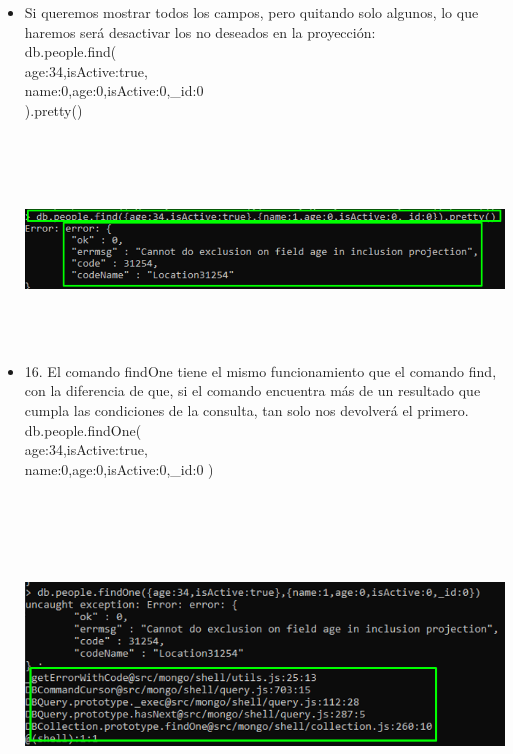 \documentclass[12pt,a4paper,oneside]{book}
\begin{document}
	\newpage
\begin{itemize}
	\item {Si queremos mostrar todos los campos, pero quitando solo algunos, lo que haremos será desactivar los no deseados en la proyección:\\
		
		db.people.find(\\
		{age:34,isActive:true},\\
		{name:0,age:0,isActive:0,\_id:0}\\
		).pretty()
		
	}\\
	\includegraphics[width=16cm, height=5cm]{img/17.png}\\
	
	
	
	\item {16.	El comando findOne tiene el mismo funcionamiento que el comando find, con la diferencia de que, si el comando encuentra más de un resultado que cumpla las condiciones de la consulta, tan solo nos devolverá el primero.\\
		
		db.people.findOne(\\
		{age:34,isActive:true},\\
		{name:0,age:0,isActive:0,\_id:0}
		)
		
		
	}\\	
	\includegraphics[width=16cm, height=8cm]{img/18.png}\\


\end{itemize}
\end{document}
